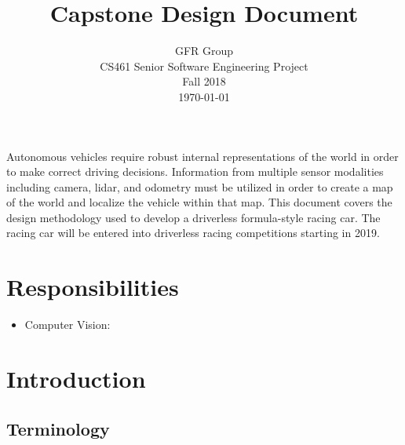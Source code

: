 \documentclass[10pt, onecolumn, draftclsnofoot, letterpaper,compsoc]{IEEEtran}
\title{Capstone Design Document}
\author{GFR Group \\
        CS461 Senior Software Engineering Project \\
        Fall 2018 \\
        \today}
\begin{document}
\maketitle

Autonomous vehicles require robust internal representations of the world in order to make correct driving decisions. Information from multiple sensor modalities including camera, lidar, and odometry must be utilized in order to create a map of the world and localize the vehicle within that map. This document covers the design methodology used to develop a driverless formula-style racing car. The racing car will be entered into driverless racing competitions starting in 2019.

\newpage
\tableofcontents
\newpage

\section{Responsibilities}
\begin{itemize}
    \item Computer Vision: 
\end{itemize}
\section{Introduction}

\subsection{Terminology}
\end{document}
